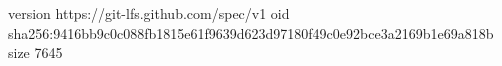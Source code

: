 version https://git-lfs.github.com/spec/v1
oid sha256:9416bb9c0c088fb1815e61f9639d623d97180f49c0e92bce3a2169b1e69a818b
size 7645
